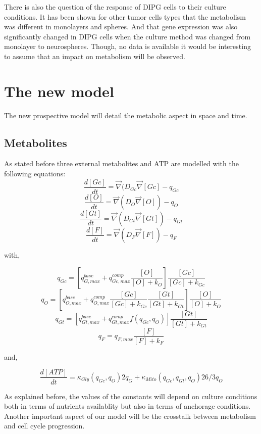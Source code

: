 \documentclass[11pt,a4paper]{article}
\begin{document}
There is also the question of the response of DIPG cells to their culture conditions. It has been shown for other tumor cells types that the metabolism was different in monolayers and spheres.\cite{Natarajan2019} And that  gene expression was also significantly changed in  DIPG cells when the culture method was changed from monolayer to neurospheres.\cite{Meel2017} Though, no data is available it would be interesting to assume that an impact on metabolism will be observed.


\section{The new model}
The new prospective model will detail the metabolic aspect in space and time.

\subsection{Metabolites} 
As stated before three external metabolites and ATP are modelled with the following equations: 
\[ \frac{d [Gc]}{d t} = \overrightarrow{\nabla} (D_{Gc} \overrightarrow{\nabla} [Gc] - q_{Gc}  \]
\[ \frac{d [O]}{d t} = \overrightarrow{\nabla} (D_O \overrightarrow{\nabla} [O]) - q_O  \]
\[ \frac{d [Gt]}{d t} = \overrightarrow{\nabla} (D_{Gt} \overrightarrow{\nabla} [Gt]) - q_{Gt}  \]
\[ \frac{d [F]}{d t} = \overrightarrow{\nabla} (D_{F} \overrightarrow{\nabla} [F]) - q_{F}  \]

with,

\[ q_{Gc} =  [ q_{G,max}^{base} + q_{Gc,max}^{comp} \frac{[O]}{[O]+ k_O}] \frac{[Gc]}{[Gc] + k_{Gc}} \]
\[ q_O =  [ q_{O,max}^{base} + q_{O,max}^{comp} \frac{[Gc]}{[Gc]+ k_{Gc}}\frac{[Gt]}{[Gt]+ k_{Gt}}] \frac{[O]}{[O] + k_O} \] 
\[ q_{Gt} =  [ q_{Gt,max}^{base} + q_{Gt,max}^{comp}f(q_{Gc},q_O)] \frac{[Gt]}{[Gt] + k_{Gt}} \]
\[ q_{F} =  q_{F,max} \frac{[F]}{[F] + k_{F}} \]

and,

\[ \frac{d[ATP]}{dt} = \kappa_{Gly} (q_{Gc},q_O) 2q_G + \kappa_{Mito}(q_{Gc},q_{Gt},q_O) 26/3q_O  \] 

As explained before, the values of the constants will depend on culture conditions both in terms of nutrients availablity but also in terms of anchorage conditions. Another important aspect of our model will be the crosstalk between metabolism and cell cycle progression.
\end{document}
